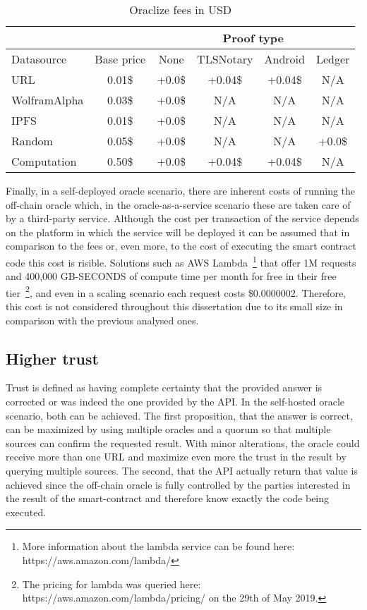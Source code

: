 \begin{table}[]
    \centering
    \begin{tabular}{@{}lccccc@{}}
    \cmidrule(l){3-6}
     & \multicolumn{1}{l}{} & \multicolumn{4}{c}{Proof type} \\ \midrule
    Datasource & Base price & None & TLSNotary & Android & Ledger \\ \midrule
    URL & 0.01\$ & +0.0\$ & +0.04\$ & +0.04\$ & N/A \\
    WolframAlpha & 0.03\$ & +0.0\$ & N/A & N/A & N/A \\
    IPFS & 0.01\$ & +0.0\$ & N/A & N/A & N/A \\
    Random & 0.05\$ & +0.0\$ & N/A & N/A & +0.0\$ \\
    Computation & 0.50\$ & +0.0\$ & +0.04\$ & +0.04\$ & N/A \\ \bottomrule
    \end{tabular}
    \caption{Oraclize fees in USD}
    \label{tab:oraclize-fees}
\end{table}

Finally, in a self-deployed oracle scenario, there are inherent costs of running the off-chain oracle which, in the oracle-as-a-service scenario these are taken care of by a third-party service. Although the cost per transaction of the service depends on the platform in which the service will be deployed it can be assumed that in comparison to the fees or, even more, to the cost of executing the smart contract code this cost is risible. Solutions such as AWS Lambda~\footnote{More information about the lambda service can be found here: https://aws.amazon.com/lambda/} that offer 1M requests and 400,000 GB-SECONDS of compute time per month for free in their free tier~\footnote{The pricing for lambda was queried here: https://aws.amazon.com/lambda/pricing/ on the 29th of May 2019.}, and even in a scaling scenario each request costs \$0.0000002. Therefore, this cost is not considered throughout this dissertation due to its small size in comparison with the previous analysed ones.

\subsection{Higher trust}

Trust is defined as having complete certainty that the provided answer is corrected or was indeed the one provided by the API. In the self-hosted oracle scenario, both can be achieved. The first proposition, that the answer is correct, can be maximized by using multiple oracles and a quorum so that multiple sources can confirm the requested result. With minor alterations, the oracle could receive more than one URL and maximize even more the trust in the result by querying multiple sources. The second, that the API actually return that value is achieved since the off-chain oracle is fully controlled by the parties interested in the result of the smart-contract and therefore know exactly the code being executed.

